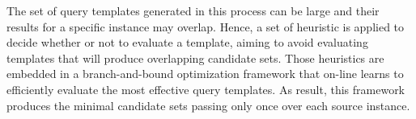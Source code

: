 The set of query templates generated in this process can be large and their results for a specific instance may overlap. Hence, a set of heuristic is applied to decide whether or not to evaluate a template, aiming to avoid evaluating templates that will produce overlapping candidate sets. Those heuristics are embedded in a branch-and-bound optimization framework that on-line learns to efficiently evaluate the most effective query templates. As result, this framework produces the minimal candidate sets passing only once over each source instance.



 